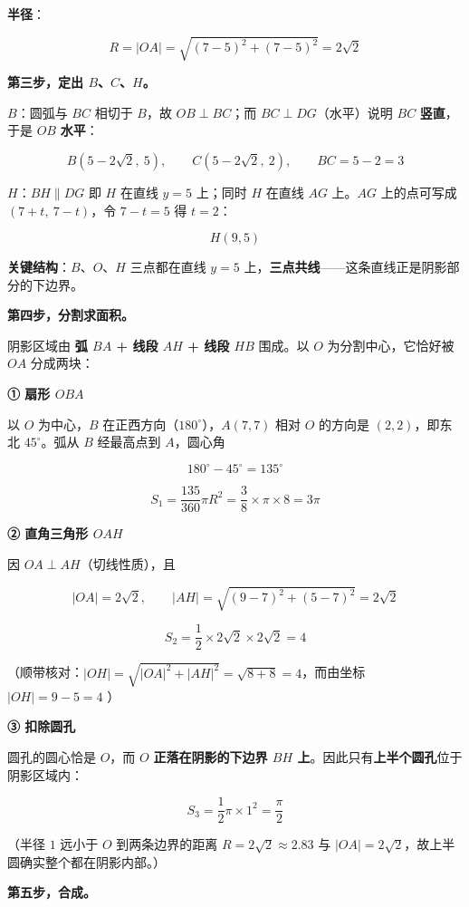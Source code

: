 \begin{answer}
\textbf{半径}：

\nopagebreak[4]
\[R=|OA|=\sqrt{(7-5)^{2}+(7-5)^{2}}=2\sqrt2\]

\textbf{第三步，定出 $B$、$C$、$H$。}

\textbf{$B$}：圆弧与 $BC$ 相切于 $B$，故 $OB\perp BC$；而 $BC\perp DG$（水平）说明 $BC$ \textbf{竖直}，于是 $OB$ \textbf{水平}：

\nopagebreak[4]
\[B\left(5-2\sqrt2,\ 5\right),\qquad C\left(5-2\sqrt2,\ 2\right),\qquad BC=5-2=3\]

\textbf{$H$}：$BH\parallel DG$ 即 $H$ 在直线 $y=5$ 上；同时 $H$ 在直线 $AG$ 上。$AG$ 上的点可写成 $(7+t,\ 7-t)$，令 $7-t=5$ 得 $t=2$：

\nopagebreak[4]
\[H(9,5)\]

\textbf{关键结构}：$B$、$O$、$H$ 三点都在直线 $y=5$ 上，\textbf{三点共线}——这条直线正是阴影部分的下边界。

\textbf{第四步，分割求面积。}

阴影区域由 \textbf{弧 $BA$ + 线段 $AH$ + 线段 $HB$} 围成。以 $O$ 为分割中心，它恰好被 $OA$ 分成两块：

\textbf{① 扇形 $OBA$}

以 $O$ 为中心，$B$ 在正西方向（$180^\circ$），$A(7,7)$ 相对 $O$ 的方向是 $(2,2)$，即东北 $45^\circ$。弧从 $B$ 经最高点到 $A$，圆心角

\nopagebreak[4]
\[180^\circ-45^\circ=135^\circ\]

\nopagebreak[4]
\[S_1=\frac{135}{360}\pi R^{2}=\frac38\times\pi\times8=3\pi\]

\textbf{② 直角三角形 $OAH$}

因 $OA\perp AH$（切线性质），且

\nopagebreak[4]
\[|OA|=2\sqrt2,\qquad |AH|=\sqrt{(9-7)^{2}+(5-7)^{2}}=2\sqrt2\]

\nopagebreak[4]
\[S_2=\frac12\times2\sqrt2\times2\sqrt2=4\]

（顺带核对：$|OH|=\sqrt{|OA|^{2}+|AH|^{2}}=\sqrt{8+8}=4$，而由坐标 $|OH|=9-5=4$ ）

\textbf{③ 扣除圆孔}

圆孔的圆心恰是 $O$，而 $O$ \textbf{正落在阴影的下边界 $BH$ 上}。因此只有\textbf{上半个圆孔}位于阴影区域内：

\nopagebreak[4]
\[S_3=\frac12\pi\times1^{2}=\frac\pi2\]

（半径 $1$ 远小于 $O$ 到两条边界的距离 $R=2\sqrt2\approx2.83$ 与 $|OA|=2\sqrt2$，故上半圆确实整个都在阴影内部。）

\textbf{第五步，合成。}


\end{answer}

